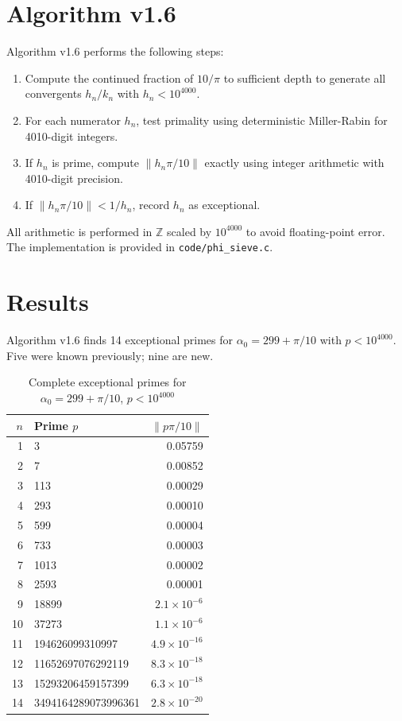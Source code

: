 \documentclass{amsart}
\theoremstyle{definition}
\begin{document}
\section{Algorithm v1.6}

Algorithm v1.6 performs the following steps:

\begin{enumerate}
\item Compute the continued fraction of $10/\pi$ to sufficient depth to
generate all convergents $h_n/k_n$ with $h_n < 10^{4000}$.
\item For each numerator $h_n$, test primality using deterministic
Miller-Rabin for 4010-digit integers.
\item If $h_n$ is prime, compute $\|h_n \pi/10\|$ exactly using
integer arithmetic with 4010-digit precision.
\item If $\|h_n \pi/10\| < 1/h_n$, record $h_n$ as exceptional.
\end{enumerate}

All arithmetic is performed in $\mathbb{Z}$ scaled by $10^{4000}$ to
avoid floating-point error. The implementation is provided in \texttt{code/phi\_sieve.c}.

\section{Results}

Algorithm v1.6 finds 14 exceptional primes for $\alpha_0 = 299 + \pi/10$
with $p < 10^{4000}$. Five were known previously; nine are new.

\begin{table}[h]
\centering
\caption{Complete exceptional primes for $\alpha_0 = 299 + \pi/10$, $p < 10^{4000}$}
\begin{tabular}{rlr}
\toprule
$n$ & Prime $p$ & $\|p\pi/10\|$ \\
\midrule
1 & 3 & 0.05759 \\
2 & 7 & 0.00852 \\
3 & 113 & 0.00029 \\
4 & 293 & 0.00010 \\
5 & 599 & 0.00004 \\
6 & 733 & 0.00003 \\
7 & 1013 & 0.00002 \\
8 & 2593 & 0.00001 \\
9 & 18899 & $2.1 \times 10^{-6}$ \\
10 & 37273 & $1.1 \times 10^{-6}$ \\
11 & 194626099310997 & $4.9 \times 10^{-16}$ \\
12 & 11652697076292119 & $8.3 \times 10^{-18}$ \\
13 & 15293206459157399 & $6.3 \times 10^{-18}$ \\
14 & 3494164289073996361 & $2.8 \times 10^{-20}$ \\
\bottomrule
\end{tabular}
\end{table}
\end{document}
